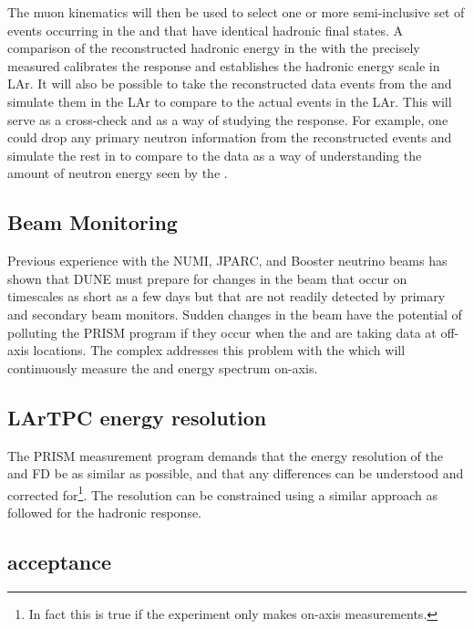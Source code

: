 The muon kinematics will then be used to select one or more semi-inclusive set of events occurring in the \larnd and  that have identical hadronic final states. A comparison of the reconstructed hadronic energy in the \larnd with the precisely measured  calibrates the response and establishes the hadronic energy scale in LAr. It will also be possible to take the reconstructed data events from the  and simulate them in the LAr to compare to the actual events in the LAr. This will serve as a cross-check and as a way of studying the response. For example, one could drop any primary neutron information from the  reconstructed events and simulate the rest in \larnd to compare to the \larnd data as a way of understanding the amount of neutron energy seen by the \larnd.

\subsection{Beam Monitoring}
Previous experience with the NUMI, JPARC, and Booster neutrino beams has shown that DUNE must prepare for changes in the beam that occur on timescales as short as a few days but that are not readily detected by primary and secondary beam monitors. Sudden changes in the beam have the potential of polluting the PRISM program if they occur when the \larnd and  are taking data at off-axis locations. The   complex addresses this problem with the  which will continuously measure the \numu and \anumu energy spectrum on-axis.


\subsection{LArTPC energy resolution}

The PRISM measurement program demands that the energy resolution of the \larnd and FD be as similar as possible, and that any differences can be understood and corrected for\footnote{In fact this is true if the experiment only makes on-axis measurements.}. The resolution can be constrained using a similar approach as followed for the hadronic response. 


\subsection{\larnd acceptance}

